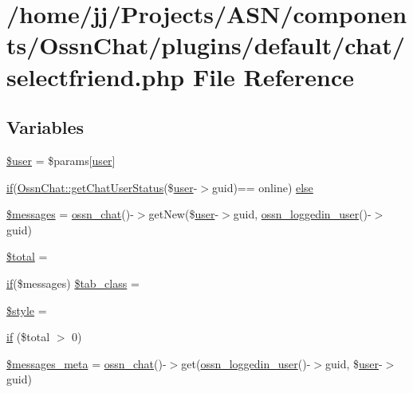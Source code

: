 \hypertarget{selectfriend_8php}{}\section{/home/jj/\+Projects/\+A\+S\+N/components/\+Ossn\+Chat/plugins/default/chat/selectfriend.php File Reference}
\label{selectfriend_8php}
\subsection*{Variables}
\begin{DoxyCompactItemize}
\item 
\hyperlink{selectfriend_8php_a598ca4e71b15a1313ec95f0df1027ca5}{\$user} = \$params\mbox{[}\textquotesingle{}\hyperlink{ossn_8config_8db_8example_8php_a802544b7ba9f79bbf24ef67773d53bed}{user}\textquotesingle{}\mbox{]}
\item 
\hyperlink{jquery_8tokeninput_8js_ad8dd46a3cbc004569e34401e9e71771a}{if}(\hyperlink{class_ossn_chat_a301019bda337dbac5509003719e3b822}{Ossn\+Chat\+::get\+Chat\+User\+Status}(\$\hyperlink{ossn_8config_8db_8example_8php_a802544b7ba9f79bbf24ef67773d53bed}{user}-\/$>$guid)== \textquotesingle{}online\textquotesingle{}) \hyperlink{selectfriend_8php_aec74c51e17ded8f77ce2edbcdf7ee80f}{else}
\item 
\hyperlink{selectfriend_8php_a21a183f927a6d243fe6b4ba3a6c4d4c8}{\$messages} = \hyperlink{ossn_8lib_8chat_8php_adfe2d47e3e6a6825beb8e3b9c8d4c6dd}{ossn\+\_\+chat}()-\/$>$get\+New(\$\hyperlink{ossn_8config_8db_8example_8php_a802544b7ba9f79bbf24ef67773d53bed}{user}-\/$>$guid, \hyperlink{ossn_8lib_8users_8php_aa3c8068d0e6638b414d6a2f6c62565b8}{ossn\+\_\+loggedin\+\_\+user}()-\/$>$guid)
\item 
\hyperlink{selectfriend_8php_a241b818f48030b628685b2e5119c5624}{\$total} = \textquotesingle{}\textquotesingle{}
\item 
\hyperlink{jquery_8tokeninput_8js_ad8dd46a3cbc004569e34401e9e71771a}{if}(\$messages) \hyperlink{selectfriend_8php_a56538721d389f3e84d4d21ba66a2ec51}{\$tab\+\_\+class} = \textquotesingle{}\textquotesingle{}
\item 
\hyperlink{selectfriend_8php_a4b16ebd3ba5d6cd79dd64e240aec4a58}{\$style} = \textquotesingle{}\textquotesingle{}
\item 
\hyperlink{selectfriend_8php_a74be1d688625bd48e8b55a552c93cb08}{if} (\$total $>$ 0)
\item 
\hyperlink{selectfriend_8php_a41491145154f27f87919627d67255cac}{\$messages\+\_\+meta} = \hyperlink{ossn_8lib_8chat_8php_adfe2d47e3e6a6825beb8e3b9c8d4c6dd}{ossn\+\_\+chat}()-\/$>$get(\hyperlink{ossn_8lib_8users_8php_aa3c8068d0e6638b414d6a2f6c62565b8}{ossn\+\_\+loggedin\+\_\+user}()-\/$>$guid, \$\hyperlink{ossn_8config_8db_8example_8php_a802544b7ba9f79bbf24ef67773d53bed}{user}-\/$>$guid)
\end{DoxyCompactItemize}


